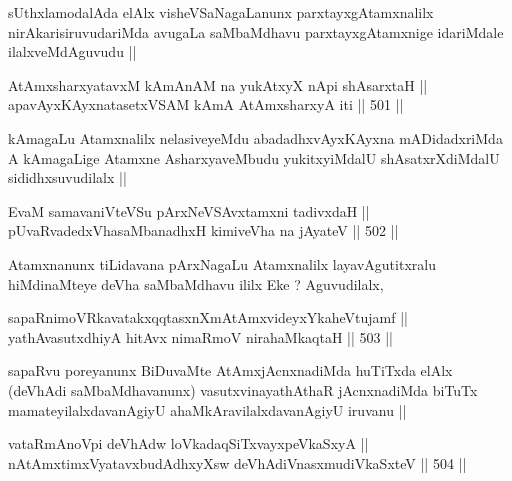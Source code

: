 \begin{artha}
sUthxlamodalAda elAlx visheVSaNagaLanunx parxtayxgAtamxnalilx
nirAkarisiruvudariMda avugaLa saMbaMdhavu parxtayxgAtamxnige
idariMdale ilalxveMdAguvudu ||
\end{artha}


\begin{shl}
AtAmxsharxyatavxM kAmAnAM na yukAtxyX nApi shAsarxtaH || \\
apavAyxKAyxnatasetxVSAM kAmA AtAmxsharxyA iti ||  501 ||  
\end{shl}

\begin{artha}
kAmagaLu Atamxnalilx nelasiveyeMdu abadadhxvAyxKAyxna mADidadxriMda A
kAmagaLige Atamxne AsharxyaveMbudu yukitxyiMdalU shAsatxrXdiMdalU
sididhxsuvudilalx ||
\end{artha}


\begin{shl}
EvaM samavaniVteVSu pArxNeVSAvxtamxni tadivxdaH ||  \\
pUvaRvadedxVhasaMbanadhxH kimiveVha na jAyateV ||  502 ||  
\end{shl}

\begin{artha}
Atamxnanunx tiLidavana pArxNagaLu Atamxnalilx layavAgutitxralu
hiMdinaMteye deVha saMbaMdhavu ililx Eke ? Aguvudilalx,
\end{artha}


\begin{shl}
sapaRnimoVRkavatakxqqtasxnXmAtAmxvideyxYkaheVtujamf || \\
yathAvasutxdhiyA hitAvx nimaRmoV nirahaMkaqtaH ||  503 ||  
\end{shl}

\begin{artha}
sapaRvu poreyanunx BiDuvaMte AtAmxjAcnxnadiMda huTiTxda elAlx (deVhAdi
saMbaMdhavanunx) vasutxvinayathAthaR jAcnxnadiMda biTuTx
mamateyilalxdavanAgiyU ahaMkAravilalxdavanAgiyU iruvanu ||
\end{artha}


\begin{shl}
vataRmAnoV\s pi deVhAdw loVkadaqSiTxvayxpeVkaSxyA ||  \\
nA\s \s tAmx\s \s timxVyatavxbudAdhxyX\s sw deVhAdiVnasxmudiVkaSxteV ||  504 || 
\end{shl}

